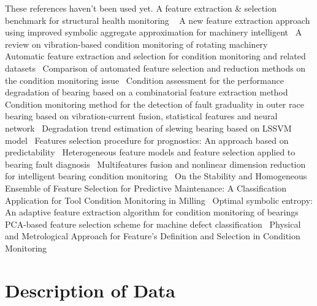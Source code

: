 \documentclass{article}
\begin{document}
These references haven't been used yet.
A feature extraction \& selection benchmark for structural health monitoring ~\cite{buckley2023feature}
A new feature extraction approach using improved symbolic aggregate approximation for machinery intelligent~\cite{zhang2019new}
A review on vibration-based condition monitoring of rotating machinery~\cite{tiboni2022review}
Automatic feature extraction and selection for condition monitoring and related datasets~\cite{schneider2018automatic}
Comparison of automated feature selection and reduction methods on the condition monitoring issue~\cite{de2018comparison}
Condition assessment for the performance degradation of bearing based on a combinatorial feature extraction method~\cite{hong2014condition}
Condition monitoring method for the detection of fault graduality in outer race bearing based on vibration-current fusion, statistical features and neural network~\cite{saucedo2021condition}
Degradation trend estimation of slewing bearing based on LSSVM model~\cite{lu2016degradation}
Features selection procedure for prognostics: An approach based on predictability~\cite{javed2012features}
Heterogeneous feature models and feature selection applied to bearing fault diagnosis~\cite{rauber2014heterogeneous}
Multifeatures fusion and nonlinear dimension reduction for intelligent bearing condition monitoring~\cite{guo2016multifeatures}
On the Stability and Homogeneous Ensemble of Feature Selection for Predictive Maintenance: A Classification Application for Tool Condition Monitoring in Milling~\cite{assafo2023stability}
Optimal symbolic entropy: An adaptive feature extraction algorithm for condition monitoring of bearings~\cite{li2023optimal}
PCA-based feature selection scheme for machine defect classification~\cite{malhi2004pca}
Physical and Metrological Approach for Feature’s Definition and Selection in Condition Monitoring~\cite{d2019physical}

\clearpage  
\section{Description of Data}
\end{document}
